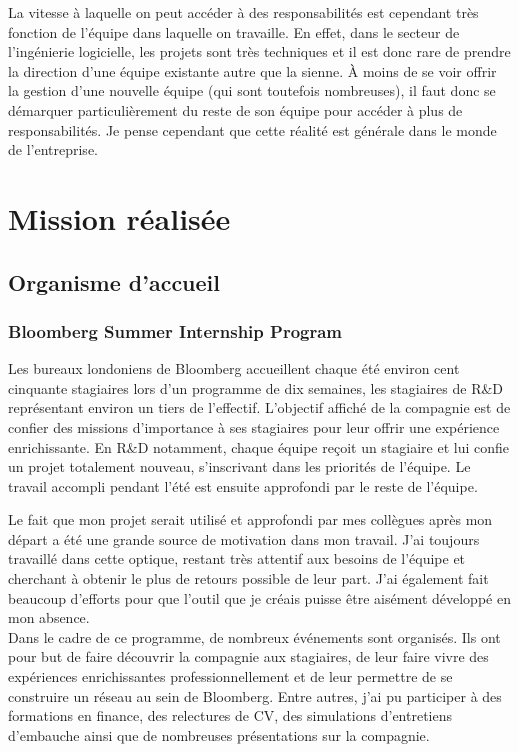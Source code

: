\documentclass[11pt, oneside, titlepage, a4paper]{article}
\begin{document}
La vitesse à laquelle on peut accéder à des responsabilités est cependant très fonction de l'équipe dans laquelle on travaille. En effet, dans le secteur de l'ingénierie logicielle, les projets sont très techniques et il est donc rare de prendre la direction d'une équipe existante autre que la sienne. À moins de se voir offrir la gestion d'une nouvelle équipe (qui sont toutefois nombreuses), il faut donc se démarquer particulièrement du reste de son équipe pour accéder à plus de responsabilités. Je pense cependant que cette réalité est générale dans le monde de l'entreprise.
\newpage
\section{Mission réalisée}
	\subsection{Organisme d'accueil}
		\subsubsection{Bloomberg Summer Internship Program}
Les bureaux londoniens de Bloomberg accueillent chaque été environ cent cinquante stagiaires lors d'un programme de dix semaines, les stagiaires de R\&D représentant environ un tiers de l'effectif. L'objectif affiché de la compagnie est de confier des missions d'importance à ses stagiaires pour leur offrir une expérience enrichissante. En R\&D notamment, chaque équipe reçoit un stagiaire et lui confie un projet totalement nouveau, s'inscrivant dans les priorités de l'équipe. Le travail accompli pendant l'été est ensuite approfondi par le reste de l'équipe.

Le fait que mon projet serait utilisé et approfondi par mes collègues après mon départ a été une grande source de motivation dans mon travail. J'ai toujours travaillé dans cette optique, restant très attentif aux besoins de l'équipe et cherchant à obtenir le plus de retours possible de leur part. J'ai également fait beaucoup d'efforts pour que l'outil que je créais puisse être aisément développé en mon absence.
\\

Dans le cadre de ce programme, de nombreux événements sont organisés. Ils ont pour but de faire découvrir la compagnie aux stagiaires, de leur faire vivre des expériences enrichissantes professionnellement et de leur permettre de se construire un réseau au sein de Bloomberg. Entre autres, j'ai pu participer à des formations en finance, des relectures de CV, des simulations d'entretiens d'embauche ainsi que de nombreuses présentations sur la compagnie.
\\
\end{document}
